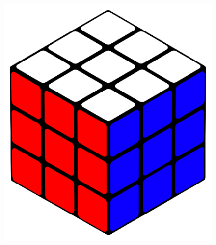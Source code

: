 \documentclass[12pt,a4paper, usenames, dvipsnames]{scrartcl}
\begin{document}
\begin{figure}[h]
\includegraphics[scale=0.04]{3x3solved.png}
\end{figure}
\end{document}

